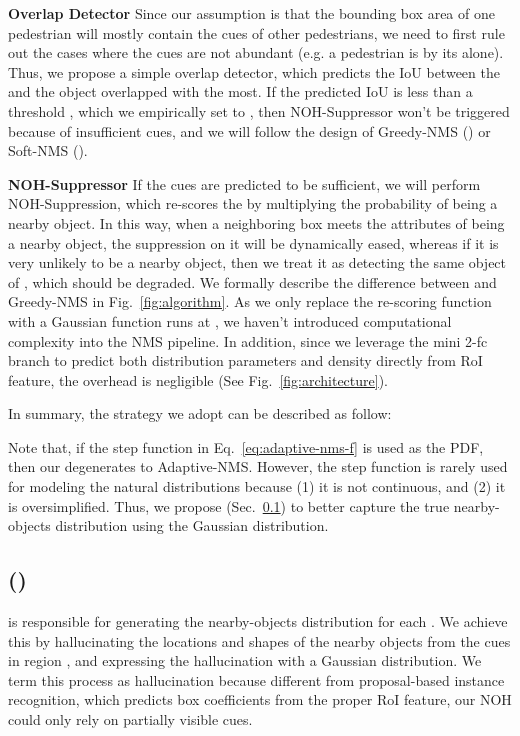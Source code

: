 \documentclass[sigconf]{acmart}
\begin{document}
\textbf{Overlap Detector} Since our assumption is that the bounding box area of one pedestrian will mostly contain the cues of other pedestrians, we need to first rule out the cases where the cues are not abundant (e.g. a pedestrian is by its alone). Thus, we propose a simple overlap detector, which predicts the IoU between the  and the object overlapped with  the most. If the predicted IoU is less than a threshold , which we empirically set to , then NOH-Suppressor won't be triggered because of insufficient cues, and we will follow the design of Greedy-NMS () or Soft-NMS ().

\textbf{NOH-Suppressor} If the cues are predicted to be sufficient, we will perform NOH-Suppression, which re-scores the  by multiplying the probability of  being a nearby object. In this way, when a neighboring box meets the attributes of being a nearby object, the suppression on it will be dynamically eased, whereas if it is very unlikely to be a nearby object, then we treat it as detecting the same object of , which should be degraded. We formally describe the difference between \nmsname{} and Greedy-NMS in Fig.~\ref{fig:algorithm}. As we only replace the re-scoring function with a Gaussian function runs at , we haven't introduced computational complexity into the NMS pipeline. In addition, since we leverage the mini 2-fc branch to predict both distribution parameters and density directly from RoI feature, the overhead is negligible (See Fig.~\ref{fig:architecture}).

In summary, the strategy we adopt can be described as follow:



  
Note that, if the step function in Eq.~\ref{eq:adaptive-nms-f} is used as the PDF, then our \nmsname{} degenerates to Adaptive-NMS. However, the step function is rarely used for modeling the natural distributions because (1) it is not continuous, and (2) it is oversimplified. Thus, we propose \heatmapnameshort{} (Sec.~\ref{sec:heatmap}) to better capture the true nearby-objects distribution using the Gaussian distribution. 

\subsection{\heatmapname{} (\heatmapnameshort{})}
\label{sec:heatmap}
\heatmapnameshort{} is responsible for generating the nearby-objects distribution for each . We achieve this by hallucinating the locations and shapes of the nearby objects from the cues in region , and expressing the hallucination with a Gaussian distribution. We term this process as hallucination because different from proposal-based instance recognition, which predicts box coefficients from the proper RoI feature, our NOH could only rely on partially visible cues.
\end{document}

